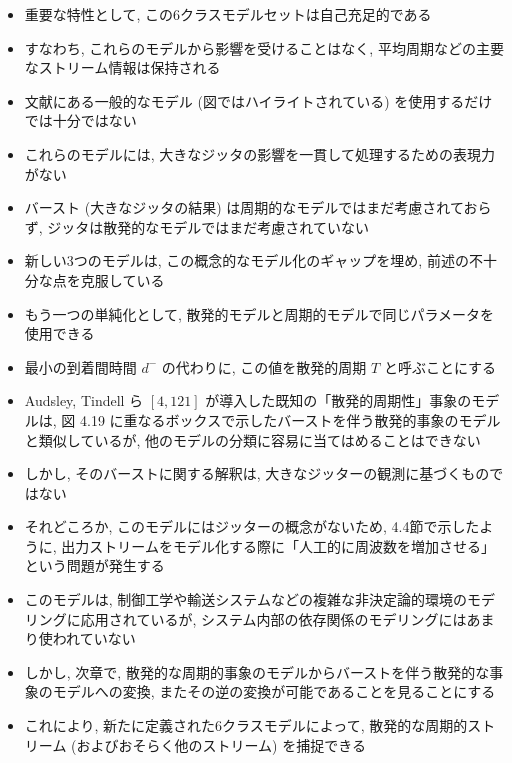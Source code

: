 \begin{frame}{}
    \begin{itemize}
        \item 重要な特性として, この6クラスモデルセットは自己充足的である
        \item すなわち, これらのモデルから影響を受けることはなく, 平均周期などの主要なストリーム情報は保持される
        \item 文献にある一般的なモデル (図ではハイライトされている) を使用するだけでは十分ではない
        \item これらのモデルには, 大きなジッタの影響を一貫して処理するための表現力がない
        \item バースト (大きなジッタの結果) は周期的なモデルではまだ考慮されておらず, ジッタは散発的なモデルではまだ考慮されていない
        \item 新しい3つのモデルは, この概念的なモデル化のギャップを埋め, 前述の不十分な点を克服している
        \item もう一つの単純化として, 散発的モデルと周期的モデルで同じパラメータを使用できる
        \item 最小の到着間時間 $d^{-}$ の代わりに, この値を散発的周期 $T$ と呼ぶことにする
    \end{itemize}
\end{frame}

\begin{frame}{}
\end{frame}

\begin{frame}{}
    \begin{itemize}
        \item Audsley, Tindell ら $[4,121]$ が導入した既知の「散発的周期性」事象のモデルは, 図 4.19 に重なるボックスで示したバーストを伴う散発的事象のモデルと類似しているが, 他のモデルの分類に容易に当てはめることはできない
        \item しかし, そのバーストに関する解釈は, 大きなジッターの観測に基づくものではない
        \item それどころか, このモデルにはジッターの概念がないため, 4.4節で示したように, 出力ストリームをモデル化する際に「人工的に周波数を増加させる」という問題が発生する
        \item このモデルは, 制御工学や輸送システムなどの複雑な非決定論的環境のモデリングに応用されているが, システム内部の依存関係のモデリングにはあまり使われていない
        \item しかし, 次章で, 散発的な周期的事象のモデルからバーストを伴う散発的な事象のモデルへの変換, またその逆の変換が可能であることを見ることにする
        \item これにより, 新たに定義された6クラスモデルによって, 散発的な周期的ストリーム (およびおそらく他のストリーム) を捕捉できる
    \end{itemize}
\end{frame}


